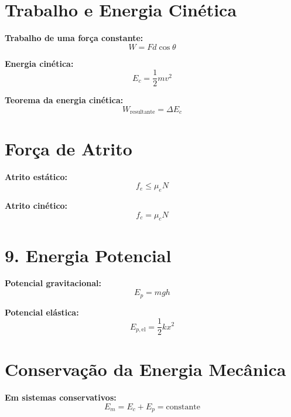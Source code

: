 \documentclass[a4paper,12pt]{article}
\begin{document}
\begin{multicols}{2}
\section{Trabalho e Energia Cinética}

\textbf{Trabalho de uma força constante:}
\begin{equation*}
  W = F d \cos \theta
\end{equation*}

\textbf{Energia cinética:}
\begin{equation*}
  E_c = \frac{1}{2} m v^2
\end{equation*}

\textbf{Teorema da energia cinética:}
\begin{equation*}
  W_{\text{resultante}} = \Delta E_c
\end{equation*}

\section{Força de Atrito}

\textbf{Atrito estático:}
\begin{equation*}
  f_e \leq \mu_e N
\end{equation*}

\textbf{Atrito cinético:}
\begin{equation*}
  f_c = \mu_c N
\end{equation*}

\section{9. Energia Potencial}

\textbf{Potencial gravitacional:}
\begin{equation*}
  E_p = m g h
\end{equation*}

\textbf{Potencial elástica:}
\begin{equation*}
  E_{p,\text{el}} = \frac{1}{2} k x^2
\end{equation*}

\section{Conservação da Energia Mecânica}

\textbf{Em sistemas conservativos:}
\begin{equation*}
  E_m = E_c + E_p = \text{constante}
\end{equation*}


\end{multicols}
\end{document}
